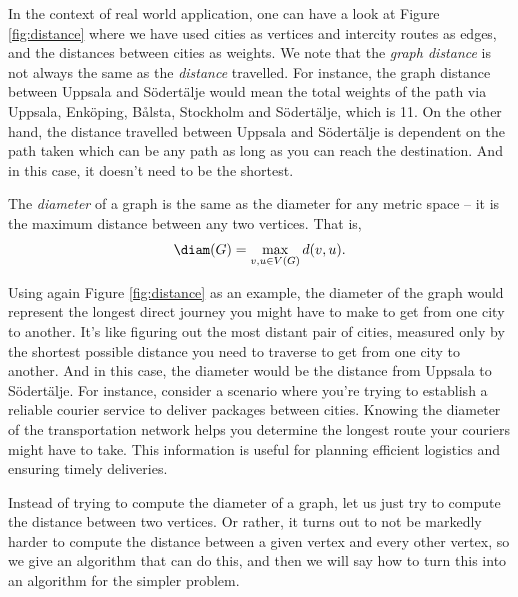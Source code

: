 \documentclass[nobib]{tufte-handout}
\begin{document}
In the context of real world application, one can have a look at Figure \ref{fig:distance} where we have used cities as vertices and intercity routes as edges, and the distances between cities as weights.  We note that the \textit{graph distance} is not always the same as the \textit{distance} travelled. For instance, the graph distance between Uppsala and Södertälje would mean the total weights of the path via Uppsala, Enköping, Bålsta, Stockholm and Södertälje, which is 11. On the other hand, the distance travelled between Uppsala and Södertälje is dependent on the path taken which can be any path as long as you can reach the destination. And in this case, it doesn't need to be the shortest.

\begin{definition}
  The \emph{diameter} of a graph is the same as the diameter for any metric space -- it is the maximum distance between any two vertices. That is,
  $$\diam(G) = \max_{v, u \in V(G)} d(v,u).$$
\end{definition}

Using again Figure \ref{fig:distance} as an example, the diameter of the graph would represent the longest direct journey you might have to make to get from one city to another. It's like figuring out the most distant pair of cities, measured only by the shortest possible distance you need to traverse to get from one city to another. And in this case, the diameter would be the distance from Uppsala to Södertälje. For instance, consider a scenario where you're trying to establish a reliable courier service to deliver packages between cities. Knowing the diameter of the transportation network helps you determine the longest route your couriers might have to take. This information is useful for planning efficient logistics and ensuring timely deliveries.

Instead of trying to compute the diameter of a graph, let us just try to compute the distance between two vertices. Or rather, it turns out to not be markedly harder to compute the distance between a given vertex and every other vertex, so we give an algorithm that can do this, and then we will say how to turn this into an algorithm for the simpler problem.
\end{document}
